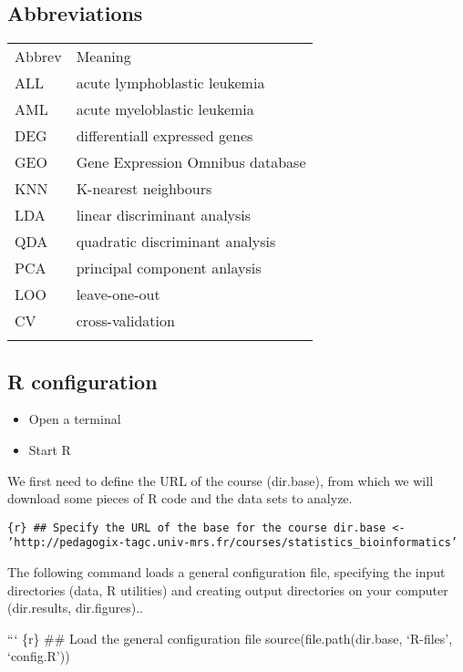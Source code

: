 \subsection{Abbreviations}\label{abbreviations}

\begin{longtable}[c]{@{}ll@{}}
\toprule\addlinespace
Abbrev & Meaning
\\\addlinespace
\midrule\endhead
ALL & acute lymphoblastic leukemia
\\\addlinespace
AML & acute myeloblastic leukemia
\\\addlinespace
DEG & differentiall expressed genes
\\\addlinespace
GEO & Gene Expression Omnibus database
\\\addlinespace
KNN & K-nearest neighbours
\\\addlinespace
LDA & linear discriminant analysis
\\\addlinespace
QDA & quadratic discriminant analysis
\\\addlinespace
PCA & principal component anlaysis
\\\addlinespace
LOO & leave-one-out
\\\addlinespace
CV & cross-validation
\\\addlinespace
\bottomrule
\end{longtable}

\subsection{R configuration}\label{r-configuration}

\begin{itemize}
\itemsep1pt\parskip0pt
\item
  Open a terminal
\item
  Start R
\end{itemize}

We first need to define the URL of the course (dir.base), from which we
will download some pieces of {R} code and the data sets to analyze.

\texttt{\{r\} \#\# Specify the URL of the base for the course dir.base \textless{}- 'http://pedagogix-tagc.univ-mrs.fr/courses/statistics\_bioinformatics'}

The following command loads a general configuration file, specifying the
input directories (data, {R} utilities) and creating output directories
on your computer (dir.results, dir.figures)..

``` \{r\} \#\# Load the general configuration file
source(file.path(dir.base, `R-files', `config.R'))

